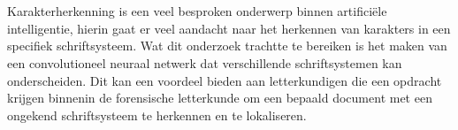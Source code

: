 
%
%

%



\chapter*{}

Karakterherkenning is een veel besproken onderwerp binnen artificiële intelligentie, hierin gaat er veel aandacht naar het herkennen van karakters in een specifiek schriftsysteem.
Wat dit onderzoek trachtte te bereiken is het maken van een convolutioneel neuraal netwerk dat verschillende schriftsystemen kan onderscheiden.
Dit kan een voordeel bieden aan letterkundigen die een opdracht krijgen binnenin de forensische letterkunde om een bepaald document met een ongekend schriftsysteem te herkennen en te lokaliseren.

